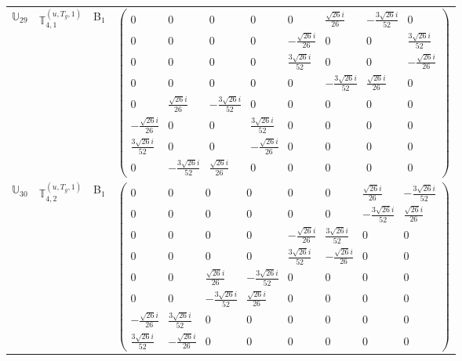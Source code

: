 \documentclass[fleqn,10pt,landscape]{article}
\begin{document}
\begin{itemize}
\begin{center}
\begin{longtable}{c|c|c|c}
$ \mathbb{U}_{29} $ & $\mathbb{T}_{4,1}^{(u,T_{g},1)}$ & B$_{1}$ & $\begin{pmatrix} 0 & 0 & 0 & 0 & 0 & \frac{\sqrt{26} i}{26} & - \frac{3 \sqrt{26} i}{52} & 0 \\ 0 & 0 & 0 & 0 & - \frac{\sqrt{26} i}{26} & 0 & 0 & \frac{3 \sqrt{26} i}{52} \\ 0 & 0 & 0 & 0 & \frac{3 \sqrt{26} i}{52} & 0 & 0 & - \frac{\sqrt{26} i}{26} \\ 0 & 0 & 0 & 0 & 0 & - \frac{3 \sqrt{26} i}{52} & \frac{\sqrt{26} i}{26} & 0 \\ 0 & \frac{\sqrt{26} i}{26} & - \frac{3 \sqrt{26} i}{52} & 0 & 0 & 0 & 0 & 0 \\ - \frac{\sqrt{26} i}{26} & 0 & 0 & \frac{3 \sqrt{26} i}{52} & 0 & 0 & 0 & 0 \\ \frac{3 \sqrt{26} i}{52} & 0 & 0 & - \frac{\sqrt{26} i}{26} & 0 & 0 & 0 & 0 \\ 0 & - \frac{3 \sqrt{26} i}{52} & \frac{\sqrt{26} i}{26} & 0 & 0 & 0 & 0 & 0 \end{pmatrix}$ \\
$ \mathbb{U}_{30} $ & $\mathbb{T}_{4,2}^{(u,T_{g},1)}$ & B$_{1}$ & $\begin{pmatrix} 0 & 0 & 0 & 0 & 0 & 0 & \frac{\sqrt{26} i}{26} & - \frac{3 \sqrt{26} i}{52} \\ 0 & 0 & 0 & 0 & 0 & 0 & - \frac{3 \sqrt{26} i}{52} & \frac{\sqrt{26} i}{26} \\ 0 & 0 & 0 & 0 & - \frac{\sqrt{26} i}{26} & \frac{3 \sqrt{26} i}{52} & 0 & 0 \\ 0 & 0 & 0 & 0 & \frac{3 \sqrt{26} i}{52} & - \frac{\sqrt{26} i}{26} & 0 & 0 \\ 0 & 0 & \frac{\sqrt{26} i}{26} & - \frac{3 \sqrt{26} i}{52} & 0 & 0 & 0 & 0 \\ 0 & 0 & - \frac{3 \sqrt{26} i}{52} & \frac{\sqrt{26} i}{26} & 0 & 0 & 0 & 0 \\ - \frac{\sqrt{26} i}{26} & \frac{3 \sqrt{26} i}{52} & 0 & 0 & 0 & 0 & 0 & 0 \\ \frac{3 \sqrt{26} i}{52} & - \frac{\sqrt{26} i}{26} & 0 & 0 & 0 & 0 & 0 & 0 \end{pmatrix}$ \\

\end{longtable}
\end{center}
\end{itemize}
\end{document}
